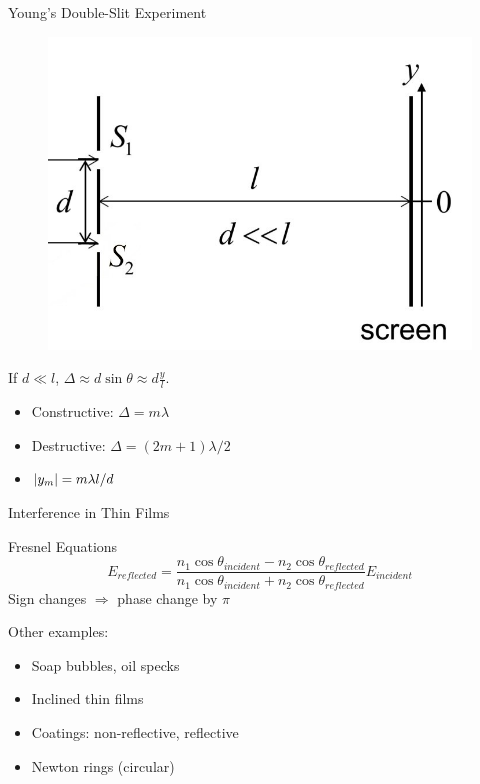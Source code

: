 \documentclass{beamer}
\begin{document}
\begin{frame}{Young's Double-Slit Experiment}
    \begin{figure}[htbp]
        \centering
        \includegraphics[height=0.5\textheight]{images/young.jpg}
    \end{figure}

    If $d\ll l$, $\Delta \approx d\sin\theta \approx d \frac{y}{l}$.
    \begin{itemize}
        \item Constructive: $\Delta=m\lambda$
        \item Destructive: $\Delta= (2m+1)\lambda/2$
        \item $\abs{y_m} = m\lambda l/d$
    \end{itemize}
\end{frame}

\begin{frame}{Interference in Thin Films}
    \begin{beamerboxesrounded}[shadow=true]{Fresnel Equations}
        \begin{equation}
            E_{reflected} = \frac{n_1\cos\theta_{incident}-n_2\cos\theta_{reflected}}{n_1\cos\theta_{incident}+n_2\cos\theta_{reflected}} E_{incident}
        \end{equation}        
        Sign changes $\Rightarrow$ phase change by $\pi$ 
    \end{beamerboxesrounded}
    \vspace{.5em}
    Other examples:
    \begin{itemize}
        \item Soap bubbles, oil specks
        \item Inclined thin films
        \item Coatings: non-reflective, reflective
        \item Newton rings (circular)
    \end{itemize}
\end{frame}
\end{document}
